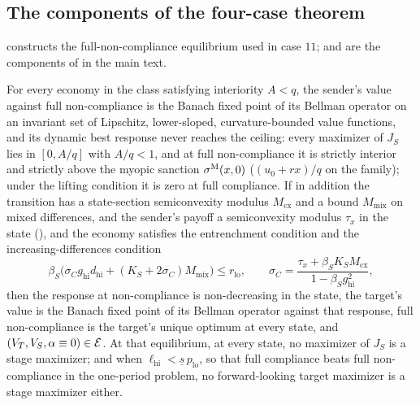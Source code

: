 \subsection{The components of the four-case theorem}
\label{sec:moved-main-2026-10-13:components}

 constructs the full-non-compliance equilibrium used in
case $11$;  and
 are the components of
 in the main text.

\begin{proposition}
\label{prop:placable-family}
For every economy in the class satisfying interiority $A<q$, the sender's value
against full non-compliance is the
Banach fixed point of its Bellman operator on an invariant set of Lipschitz,
lower-sloped, curvature-bounded value functions, and its dynamic best response
never reaches the ceiling:
every maximizer of $J_S$ lies in $[0,A/q]$ with $A/q<1$, and
at full non-compliance it is strictly interior and
strictly above the myopic sanction $\sigma^{\mathrm{M}}(x,0)$ ($(u_0+rx)/q$ on the
family); under the lifting condition it
is zero at full compliance. If in addition the transition has a state-section
semiconvexity modulus $M_{\mathrm{cx}}$ and a bound $M_{\mathrm{mix}}$ on mixed
differences, and the sender's payoff a semiconvexity modulus $\tau_x$ in the state
(), and the economy satisfies the entrenchment condition and the
increasing-differences condition
\begin{equation}
\beta_S\bigl(\sigma_C g_{\mathrm{hi}} d_{\mathrm{hi}}
+(K_S+2\sigma_C)M_{\mathrm{mix}}\bigr)\le r_{\mathrm{lo}},
\qquad
\sigma_C=\frac{\tau_x+\beta_S K_S M_{\mathrm{cx}}}{1-\beta_S g_{\mathrm{hi}}^2},
\label{eq:rally-margin}
\end{equation}
then the response at non-compliance is non-decreasing in the state, the
target's value is the Banach fixed point of its Bellman operator against
that response, full non-compliance is the target's unique optimum at every
state, and $(V_T,V_S,\alpha\equiv0)\in\mathcal E$. At that equilibrium, at
every state, no maximizer of $J_S$ is a stage maximizer; and
when $\ell_{\mathrm{hi}}<\underline s\,p_{\mathrm{lo}}$, so that full compliance
beats full non-compliance in the one-period problem, no
forward-looking target maximizer is a stage maximizer either.
\end{proposition}

